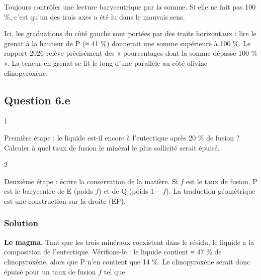 \documentclass[11pt,a4paper]{article}
\begin{document}
\begin{methode}

Toujours contrôler une lecture barycentrique par la somme. Si elle ne fait pas 100 \%, c'est qu'un des trois axes a été lu dans le mauvais sens.

\end{methode}

\begin{piege}

Ici, les graduations du côté gauche sont portées par des traits horizontaux : lire le grenat à la hauteur de P (≈ 41 \%) donnerait une somme supérieure à 100 \%. Le rapport 2026 relève précisément des « pourcentages dont la somme dépasse 100 \% ». La teneur en grenat se lit le long d'une parallèle au côté olivine -- clinopyroxène.

\end{piege}

\hypertarget{question-6.e}{%
\subsection{Question 6.e}\label{question-6.e}}

\begin{indication}{1}

Première étape : le liquide est-il encore à l'eutectique après 20 \% de fusion ? Calculer à quel taux de fusion le minéral le plus sollicité serait épuisé.

\end{indication}

\begin{indication}{2}

Deuxième étape : écrire la conservation de la matière. Si \(f\) est le taux de fusion, P est le barycentre de E (poids \(f\)) et de Q (poids \(1-f\)). La traduction géométrique est une construction sur la droite (EP).

\end{indication}

\hypertarget{solution-20}{%
\subsubsection{Solution}\label{solution-20}}

\textbf{Le magma.} Tant que les trois minéraux coexistent dans le résidu, le liquide a la composition de l'eutectique. Vérifions-le : le liquide contient ≈ 47 \% de clinopyroxène, alors que P n'en contient que 14 \%. Le clinopyroxène serait donc épuisé pour un taux de fusion \(f\) tel que
\end{document}
